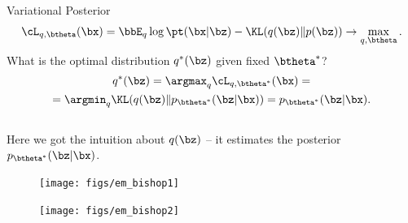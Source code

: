 \documentclass{beamer}
\begin{document}
\begin{frame}{Variational Posterior}
	\[
		\cL_{q, \btheta}(\bx)  =  \bbE_{q} \log \pt(\bx | \bz) - \KL (q(\bz) \| p(\bz)) \rightarrow \max_{q, \btheta}.
	\]
	What is the optimal distribution $q^*(\bz)$ given fixed $\btheta^*$?
    \eqpause
	\vspace{-0.3cm}
	\begin{multline*}
		q^*(\bz) = \argmax_q \cL_{q, \btheta^*}(\bx) = \\
		= \argmin_q \KL(q(\bz) \| p_{\btheta^*}(\bz | \bx)) = p_{\btheta^*}(\bz| \bx).
	\end{multline*}
	\vspace{-0.3cm} \\
	Here we got the intuition about $q(\bz)$ – it estimates the posterior~$p_{\btheta^*}(\bz| \bx)$.
	\vspace{-0.3cm}
    \eqpause
	\begin{minipage}[t]{0.45\columnwidth}
		\begin{figure}
			\texttt{[image: figs/em\_bishop1]}
		\end{figure}
	\end{minipage}%
	\begin{minipage}[t]{0.55\columnwidth}
		\begin{figure}
			\texttt{[image: figs/em\_bishop2]}
		\end{figure}
	\end{minipage}
\end{frame}
\end{document}
